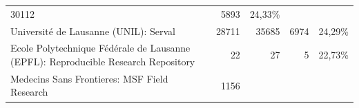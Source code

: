 \documentclass[a4paper,
fontsize=11pt,
oneside,
numbers=noperiodatend,
parskip=half-,
bibliography=totoc,
final
]{scrartcl}
\begin{document}
\begin{longtable}[c]{@{}lrrrr@{}}
\begin{minipage}[t]{0.16\columnwidth}\raggedleft\strut
30112
\strut\end{minipage} &
\begin{minipage}[t]{0.14\columnwidth}\raggedleft\strut
5893
\strut\end{minipage} &
\begin{minipage}[t]{0.14\columnwidth}\raggedleft\strut
24,33\%
\strut\end{minipage}\tabularnewline
\begin{minipage}[t]{0.25\columnwidth}\raggedright\strut
Université de Lausanne (UNIL): Serval
\strut\end{minipage} &
\begin{minipage}[t]{0.16\columnwidth}\raggedleft\strut
28711
\strut\end{minipage} &
\begin{minipage}[t]{0.16\columnwidth}\raggedleft\strut
35685
\strut\end{minipage} &
\begin{minipage}[t]{0.14\columnwidth}\raggedleft\strut
6974
\strut\end{minipage} &
\begin{minipage}[t]{0.14\columnwidth}\raggedleft\strut
24,29\%
\strut\end{minipage}\tabularnewline
\begin{minipage}[t]{0.25\columnwidth}\raggedright\strut
Ecole Polytechnique Fédérale de Lausanne (EPFL): Reproducible Research
Repository
\strut\end{minipage} &
\begin{minipage}[t]{0.16\columnwidth}\raggedleft\strut
22
\strut\end{minipage} &
\begin{minipage}[t]{0.16\columnwidth}\raggedleft\strut
27
\strut\end{minipage} &
\begin{minipage}[t]{0.14\columnwidth}\raggedleft\strut
5
\strut\end{minipage} &
\begin{minipage}[t]{0.14\columnwidth}\raggedleft\strut
22,73\%
\strut\end{minipage}\tabularnewline
\begin{minipage}[t]{0.25\columnwidth}\raggedright\strut
Medecins Sans Frontieres: MSF Field Research
\strut\end{minipage} &
\begin{minipage}[t]{0.16\columnwidth}\raggedleft\strut
1156
\strut\end{minipage} &

\end{longtable}
\end{document}

